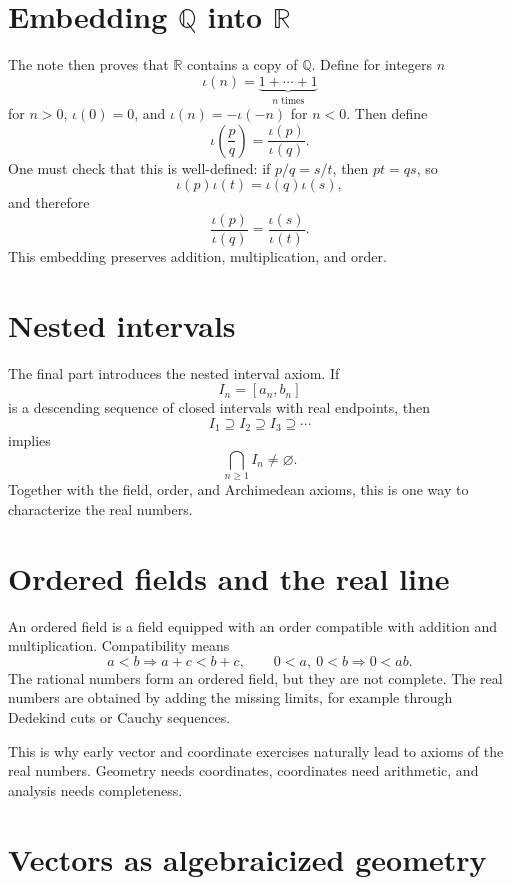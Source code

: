 \section[Embedding Q into R]{Embedding \(\mathbb Q\) into \(\mathbb R\)}

The note then proves that \(\mathbb R\) contains a copy of \(\mathbb Q\).  Define for integers \(n\)
\[
  \iota(n)=\underbrace{1+\cdots+1}_{n\text{ times}}
\]
for \(n>0\), \(\iota(0)=0\), and \(\iota(n)=-\iota(-n)\) for \(n<0\).  Then define
\[
  \iota\left(\frac pq\right)=\frac{\iota(p)}{\iota(q)}.
\]
One must check that this is well-defined: if \(p/q=s/t\), then \(pt=qs\), so
\[
  \iota(p)\iota(t)=\iota(q)\iota(s),
\]
and therefore
\[
  \frac{\iota(p)}{\iota(q)}=\frac{\iota(s)}{\iota(t)}.
\]
This embedding preserves addition, multiplication, and order.

\section{Nested intervals}

The final part introduces the nested interval axiom.  If
\[
  I_n=[a_n,b_n]
\]
is a descending sequence of closed intervals with real endpoints, then
\[
  I_1\supseteq I_2\supseteq I_3\supseteq\cdots
\]
implies
\[
  \bigcap_{n\ge1}I_n\neq\varnothing.
\]
Together with the field, order, and Archimedean axioms, this is one way to characterize the real numbers.


\section{Ordered fields and the real line}

An ordered field is a field equipped with an order compatible with addition and multiplication.  Compatibility means
\[
  a<b\Rightarrow a+c<b+c,\qquad
  0<a,\ 0<b\Rightarrow0<ab.
\]
The rational numbers form an ordered field, but they are not complete.  The real numbers are obtained by adding the missing limits, for example through Dedekind cuts or Cauchy sequences.

This is why early vector and coordinate exercises naturally lead to axioms of the real numbers.  Geometry needs coordinates, coordinates need arithmetic, and analysis needs completeness.

\section{Vectors as algebraicized geometry}

